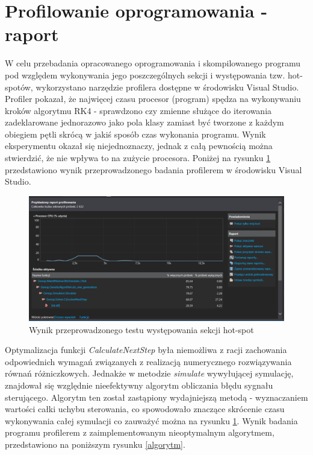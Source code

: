\section{Profilowanie oprogramowania - raport}

W celu przebadania opracowanego oprogramowania i skompilowanego programu pod względem wykonywania jego poszczególnych sekcji i występowania tzw. hot-spotów, wykorzystano narzędzie profilera dostępne w środowisku Visual Studio. \newline
Profiler pokazał, że najwięcej czasu procesor (program) spędza na wykonywaniu kroków algorytmu RK4 - sprawdzono czy zmienne służące do iterowania zadeklarowane jednorazowo jako pola klasy zamiast być tworzone z każdym obiegiem pętli skrócą w jakiś sposób czas wykonania programu. Wynik eksperymentu okazał się niejednoznaczy, jednak z całą pewnością można stwierdzić, że nie wpływa to na zużycie procesora.\newline
Poniżej na rysunku \ref{profiler1} przedstawiono wynik przeprowadzonego badania profilerem w środowisku Visual Studio.

\begin{figure}[ht!]
\centering
\includegraphics[scale=0.42]{profiler1}
\caption{Wynik przeprowadzonego testu występowania sekcji hot-spot}
\label{profiler1}
\end{figure} 

Optymalizacja funkcji \textit{CalculateNextStep} była niemożliwa z racji zachowania odpowiednich wymagań związanych z realizacją numerycznego rozwiązywania równań różniczkowych.\newline
Jednakże w metodzie \textit{simulate} wywyłującej symulację, znajdował się względnie nieefektywny algorytm obliczania błędu sygnału sterującego. Algorytm ten został zastąpiony wydajniejszą metodą - wyznaczaniem wartości całki uchybu sterowania, co spowodowało znaczące skrócenie czasu wykonywania całej symulacji co zauważyć można na rysunku \ref{profiler1}. \newline Wynik badania programu profilerem z zaimplementowanym nieoptymalnym algorytmem, przedstawiono na poniższym rysunku \ref{algorytm}.
\newpage

